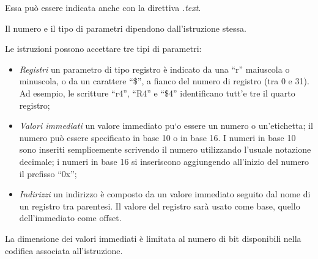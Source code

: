 \documentclass[letterpaper,10pt,italian]{sphinxmanual}
\begin{document}
Essa può essere indicata anche con la direttiva \emph{.text}.

Il numero e il tipo di parametri dipendono dall'istruzione stessa.

Le istruzioni possono accettare tre tipi di parametri:
\begin{itemize}
\item {} 
\emph{Registri} un parametro di tipo registro è indicato da una
``r'' maiuscola o minuscola, o da un carattere ``\$'', a fianco del numero
di registro (tra 0 e 31). Ad esempio, le scritture ``r4'', ``R4'' e ``\$4''
identificano tutt'e tre il quarto registro;

\item {} 
\emph{Valori immediati} un valore immediato pu{}`o essere un numero o
un'etichetta; il numero può essere specificato in base 10 o in base 16. I
numeri in base 10 sono inseriti semplicemente scrivendo il numero
utilizzando l'usuale notazione decimale; i numeri in base 16 si inseriscono
aggiungendo all'inizio del numero il prefisso ``0x'';

\item {} 
\emph{Indirizzi} un indirizzo è composto da un valore immediato
seguito dal nome di un registro tra parentesi. Il valore del registro sarà
usato come base, quello dell'immediato come offset.

\end{itemize}

La dimensione dei valori immediati è limitata al numero di bit disponibili
nella codifica associata all'istruzione.
\end{document}
